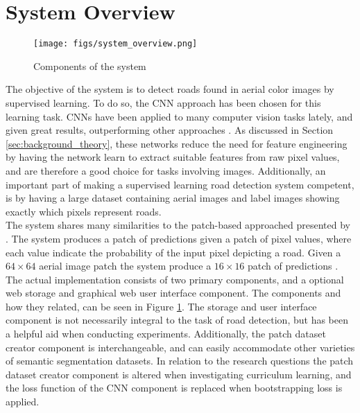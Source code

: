 \section{System Overview}
\label{sec:systemOverview}
\begin{figure}[t]
\begin{center}
\texttt{[image: figs/system\_overview.png]}
\caption[Components of the system]{Components of the system}
\label{fig:system_components}
\end{center}
\end{figure}

The objective of the system is to detect roads found in aerial color images by supervised learning. To do so, the \ac{CNN} approach has been chosen for this learning task. \ac{CNN}s have been applied to many computer vision tasks lately, and given great results, outperforming other approaches \citep{Krizhevsky_imagenet} . As discussed in Section \ref{sec:background_theory}, these networks reduce the need for feature engineering by having the network learn to extract suitable features from raw pixel values, and are therefore a good choice for tasks involving images. Additionally, an important part of making a supervised learning road detection system competent, is by having a large dataset containing aerial images and label images showing exactly which pixels represent roads.\\


The system shares many similarities to the patch-based approached presented by \cite{Mnih_aerial_images_noisy}. The system produces a patch of predictions given a patch of pixel values, where each value indicate the probability of the input pixel depicting a road. Given a $64 \times 64$ aerial image patch the system produce a $16 \times 16$ patch of predictions .\\


The actual implementation consists of two primary components, and a optional web storage and graphical web user interface component. The components and how they related, can be seen in Figure \ref{fig:system_components}. The storage and user interface component is not necessarily  integral to the task of road detection, but has been a helpful aid when conducting experiments. Additionally, the patch dataset creator component is interchangeable, and can easily accommodate other varieties of semantic segmentation datasets. In relation to the research questions the patch dataset creator component is altered when investigating curriculum learning, and the loss function of the \ac{CNN} component is replaced when bootstrapping loss is applied. \\


